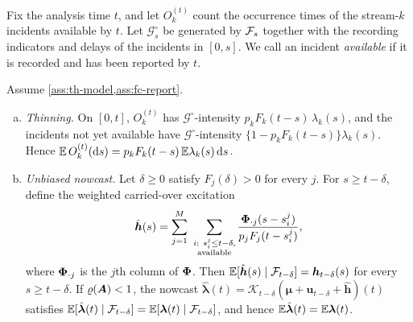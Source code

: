 Fix the analysis time $t$, and let $O^{(t)}_k$ count the occurrence times of the
stream-$k$ incidents available by $t$. Let $\mathcal G^{\circ}_s$ be generated by
$\mathcal{F}_s$ together with the recording indicators and delays of the incidents in
$[0,s]$. We call an incident \emph{available} if it is recorded and has been reported by
$t$.

\begin{proposition}\label{prop:nowcast}
Assume \cref{ass:th-model,ass:fc-report}.
\begin{enumerate}[(a)]
  \item \emph{Thinning.} On $[0,t]$, $O^{(t)}_k$ has $\mathcal G^\circ$-intensity
  $p_kF_k(t-s)\,\lambda_k(s)$, and the incidents not yet available have
  $\mathcal G^\circ$-intensity $\{1-p_kF_k(t-s)\}\lambda_k(s)$. Hence
  $\mathbb{E}\,O^{(t)}_k(\mathrm{d} s)=p_kF_k(t-s)\,\mathbb{E}\lambda_k(s)\,\mathrm{d} s$.
  \item \emph{Unbiased nowcast.} Let $\delta\ge0$ satisfy $F_j(\delta)>0$ for every
  $j$. For $s\ge t-\delta$, define the weighted carried-over excitation
  \begin{equation}\label{eq:fc-ht}
    \hat{\bm h}(s)=\sum_{j=1}^{M}\ \sum_{\substack{i:\ s^j_i\le t-\delta,\\ \text{available}}}
    \frac{\bm{\Phi}_{\cdot j}(s-s^j_i)}{p_jF_j(t-s^j_i)},
  \end{equation}
  where $\bm{\Phi}_{\cdot j}$ is the $j$th column of $\bm{\Phi}$. Then
  $\mathbb{E}[\hat{\bm h}(s)\mid\mathcal{F}_{t-\delta}]=\bm h_{t-\delta}(s)$ for every
  $s\ge t-\delta$. If $\varrho(\bm{A})<1$, the nowcast
  $\hat{\bm\lambda}(t)=\mathcal K_{t-\delta}(\bm\mu+\bm u_{t-\delta}+\hat{\bm h})(t)$
  satisfies
  $\mathbb{E}[\hat{\bm\lambda}(t)\mid\mathcal{F}_{t-\delta}]=\mathbb{E}[\bm\lambda(t)\mid\mathcal{F}_{t-\delta}]$,
  and hence $\mathbb{E}\hat{\bm\lambda}(t)=\mathbb{E}\bm\lambda(t)$.


\end{enumerate}
\end{proposition}
